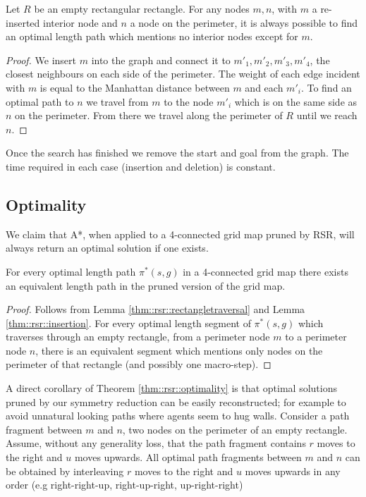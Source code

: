 \begin{lemma}
\label{thm::rsr::insertion}
Let $R$ be an empty rectangular rectangle.
For any nodes $m, n$, with $m$ a re-inserted interior node and $n$ a node on the perimeter,
it is always possible to find an optimal length path which mentions no interior nodes except for $m$.
\end{lemma}
\begin{proof}
We insert $m$ into the graph and connect it to 
$m'_{1}, m'_{2}, m'_{3}, m'_{4}$, the closest neighbours on 
each side of the perimeter.
The weight of each edge incident with $m$ is equal to the Manhattan distance between
$m$ and each $m'_{i}$.
To find an optimal path to $n$ we travel from $m$ to the node $m'_{i}$ which is 
on the same side as $n$ on the perimeter.
From there we travel along the perimeter of $R$ until we reach $n$.
\end{proof}

Once the search has finished we remove the start and goal from the graph.
The time required in each case (insertion and deletion) is constant.

\subsection{Optimality}
\label{char::rsr::optimal4c}
We claim that A*, when applied to a 4-connected grid map pruned by RSR, 
will always return an optimal solution if one exists.

\begin{theorem}
\label{thm::rsr::optimality}
For every optimal length path $\pi^*(s, g)$ in a 4-connected grid map there exists
an equivalent length path in the pruned version of the grid map.
\end{theorem}
\begin{proof}
Follows from Lemma \ref{thm::rsr::rectangletraversal} and Lemma \ref{thm::rsr::insertion}.
For every optimal length segment of $\pi^{*}(s, g)$ which traverses
through an empty rectangle, from a perimeter node $m$ to a perimeter node $n$, 
there is an equivalent segment which mentions only nodes
on the perimeter of that rectangle (and possibly one macro-step).
\end{proof}

A direct corollary of Theorem \ref{thm::rsr::optimality} is that optimal solutions
pruned by our symmetry reduction can be easily reconstructed; for example to
avoid unnatural looking paths where agents seem to hug walls.
Consider a path fragment between $m$ and $n$, two nodes on the perimeter of an empty rectangle.
Assume, without any generality loss, that the path fragment contains $r$ moves to the right and $u$ moves upwards.
All optimal path fragments between $m$ and $n$ can be obtained by interleaving $r$ moves to the right
and $u$ moves upwards in any order (e.g right-right-up, right-up-right, up-right-right)



